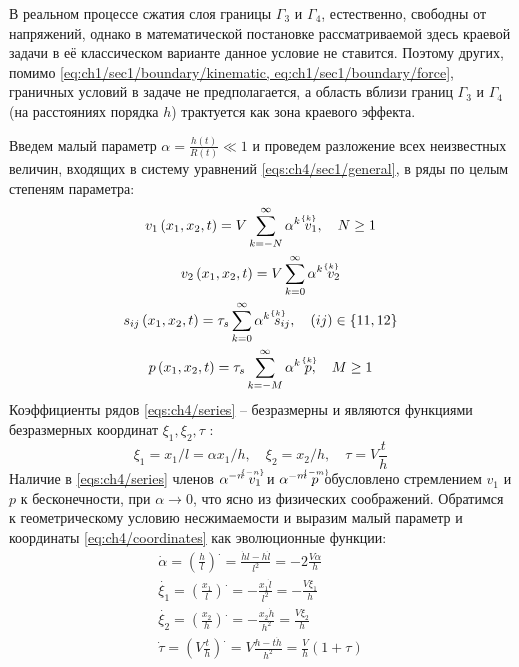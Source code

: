 В реальном процессе сжатия слоя границы $\Gamma_{3}$ и $\Gamma_{4}$, естественно, свободны от напряжений, однако в математической постановке рассматриваемой здесь краевой задачи в её классическом варианте данное условие не ставится. Поэтому других, помимо \cref{eq:ch1/sec1/boundary/kinematic, eq:ch1/sec1/boundary/force}, граничных условий в задаче не предполагается, а область вблизи границ $\Gamma_{3}$ и $\Gamma_{4}$ (на расстояниях порядка $h$) трактуется как зона краевого эффекта.

Введем малый параметр $\alpha = \frac{h(t)}{R(t)} \ll 1$ и проведем разложение всех неизвестных величин, входящих в систему уравнений \cref{eqs:ch4/sec1/general}, в ряды по целым степеням параметра:
\begin{subequations}
  \label{eqs:ch4/series}
  \begin{gather}
    v_{1}\left(x_1, x_2, t\right) = V \sum_{k=-N}^{\infty}{\alpha^{k} \; \uindex{v}{k}_{1}}, \quad N \ge 1
    \\
    v_{2}\left(x_1, x_2, t\right) = V \sum_{k=0}^{\infty}{\alpha^{k} \; \uindex{v}{k}_{2}}
    \\
    s_{ij}\left(x_1, x_2, t\right) = \tau_{s} \sum_{k=0}^{\infty}{\alpha^{k} \; \uindex{s}{k}_{ij}}, \quad (ij)\in\{11, 12\}
    \\
    p\left(x_1, x_2, t\right) = \tau_{s} \sum_{k=-M}^{\infty}{\alpha^{k} \; \uindex{p}{k}}, \quad M \ge 1
  \end{gather}
\end{subequations}
Коэффициенты рядов \cref{eqs:ch4/series} -- безразмерны и являются функциями безразмерных координат $\xi_1, \xi_2, \tau$ :
\begin{equation}
  \label{eq:ch4/coordinates}
  \xi_1 = x_1 / l = \alpha x_1 / h, \quad \xi_2 = x_2 / h, \quad \tau = V \frac{t}{h}
\end{equation}
Наличие в \cref{eqs:ch4/series} членов $\alpha^{-n} \; \uindex{v}{-n}_{1}$ и $\alpha^{-m} \; \uindex{p}{-m}$ обусловлено стремлением $v_{1}$ и $p$ к бесконечности, при $\alpha\rightarrow 0$, что ясно из физических соображений.
Обратимся к геометрическому условию несжимаемости и выразим малый параметр и координаты \cref{eq:ch4/coordinates} как эволюционные функции:
\begingroup
\allowdisplaybreaks
\begin{subequations}
  \begin{gather}
    \dot{\alpha} = \left(\frac{h}{l}\right)^. = \frac{\dot{h}l - h\dot{l}}{l^2} = -2\frac{V\alpha}{h}
    \\
    \dot{\xi_1} = \left(\frac{x_1}{l}\right)^. = -\frac{x_1 \dot{l}}{l^2} = -\frac{V\xi_1}{h}
    \\
    \dot{\xi_2} = \left(\frac{x_2}{h}\right)^. = -\frac{x_2 \dot{h}}{h^2} = \frac{V\xi_2}{h}
    \\
    \dot{\tau} = \left(V \frac{t}{h}\right)^. = V \frac{h - t\dot{h}}{h^2} = \frac{V}{h} \left(1+\tau\right)
  \end{gather}
\end{subequations}
